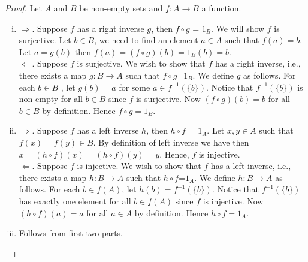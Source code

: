 \documentclass[a4paper,english,12pt]{article}   	%
\begin{document}
\begin{proof} Let $A$ and $B$ be non-empty sets and $f: A \to B$ a function.
\begin{enumerate}[i)] 
	\item $\Rightarrow$. Suppose $f$ has a right inverse $g$, then $f \circ g$ = $1_{B}$. We will show $f$ is surjective. Let $b \in B$, we need to find an element $a \in A$ such that $f(a)=b$. Let $a=g(b)$ then $f(a)  = (f \circ g)(b) =1_{B}(b)=b$.\\
$\Leftarrow$. Suppose $f$ is surjective. We wish to show that $f$ has a right inverse, i.e., there exists a map $g : B \to A$ such that $f \circ g$=$1_{B}$. We define $g$ as follows. For each $b \in B$ , let $g(b)=a$ for some $a \in f^{-1}(\{b\})$. Notice that $f^{-1}(\{b\})$ is non-empty for all $b \in B$ since $f$ is surjective. Now $(f \circ g)(b)=b$ for all $b \in B$ by definition. Hence $f \circ g = 1_{B}$.
	\item $\Rightarrow$. Suppose $f$ has a left inverse $h$, then $h \circ f$ = $1_{A}$. %
	Let $x,y \in A$ such that $f(x) = f(y) \in B$. By definition of left inverse we have then $x = (h \circ f)(x) = (h \circ f)(y) = y$. Hence, $f$ is injective.\\
$\Leftarrow$. Suppose $f$ is injective. We wish to show that $f$ has a left inverse, i.e., there exists a map $h \colon B \to A$ such that $h \circ f$=$1_{A}$. We define $h: B \to A$ as follows. For each $b \in f(A)$, let $h(b)=f^{-1}(\{b\})$. Notice that $f^{-1}(\{b\})$ has exactly one element for all $b \in f(A)$ since $f$ is injective. Now $(h \circ f)(a)=a$ for all $a \in A$ by definition. Hence $h \circ f = 1_{A}$.
	\item Follows from first two parts.
\end{enumerate}
\end{proof} 
\end{document}
